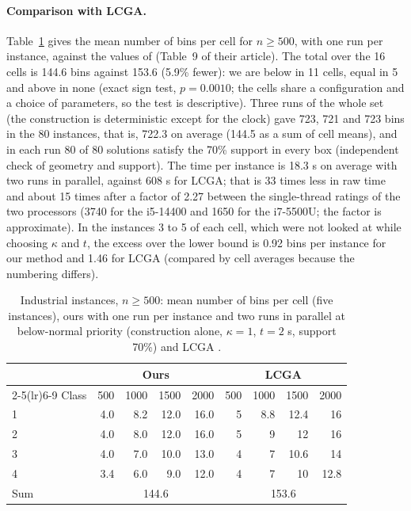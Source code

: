 \paragraph{Comparison with LCGA.}
Table~\ref{tab:e-ind} gives the mean number of bins per cell for $n\ge 500$, with one run per instance, against the values of \citet{Elhedhli2019} (Table~9 of their article). The total over the 16 cells is 144.6 bins against 153.6 (5.9\% fewer):
we are below in 11 cells, equal in 5 and above in none (exact sign test, $p=0.0010$; the cells share a configuration and a choice of parameters, so the test is descriptive). Three runs of the whole set (the construction is deterministic except for the clock) gave 723, 721 and 723 bins in the 80 instances,
that is, 722.3 on average (144.5 as a sum of cell means), and in each run 80 of 80 solutions satisfy the 70\% support in every box (independent check of geometry and support). The time per instance is 18.3 s on average with two runs in parallel, against 608 s for LCGA;
that is 33 times less in raw time and about 15 times after a factor of 2.27 between the single-thread ratings of the two processors \citep{PassMark} (3740 for the i5-14400 and 1650 for the i7-5500U; the factor is approximate). In the instances 3 to 5 of each cell, which were not looked at while choosing $\kappa$ and $t$, the excess over the lower bound
is 0.92 bins per instance for our method and 1.46 for LCGA (compared by cell averages because the numbering differs).

\begin{table}[t]
\centering
\small\setlength{\tabcolsep}{4pt}
\caption{Industrial instances, $n\ge 500$: mean number of bins per cell (five instances), ours with one run per instance and two runs in parallel at below-normal priority (construction alone, $\kappa=1$,
$t=2$ s, support 70\%) and LCGA \citep{Elhedhli2019}.}
\label{tab:e-ind}
\begin{tabular}{@{}lrrrrrrrr@{}}
\toprule
 & \multicolumn{4}{c}{Ours} & \multicolumn{4}{c}{LCGA}\\
\cmidrule(lr){2-5}\cmidrule(lr){6-9}
Class & 500 & 1000 & 1500 & 2000 & 500 & 1000 & 1500 & 2000\\
\midrule
1 & 4.0 & 8.2 & 12.0 & 16.0 & 5 & 8.8 & 12.4 & 16\\
2 & 4.0 & 8.0 & 12.0 & 16.0 & 5 & 9 & 12 & 16\\
3 & 4.0 & 7.0 & 10.0 & 13.0 & 4 & 7 & 10.6 & 14\\
4 & 3.4 & 6.0 & 9.0 & 12.0 & 4 & 7 & 10 & 12.8\\
\midrule
Sum & \multicolumn{4}{c}{144.6} & \multicolumn{4}{c}{153.6}\\
\bottomrule
\end{tabular}
\end{table}


